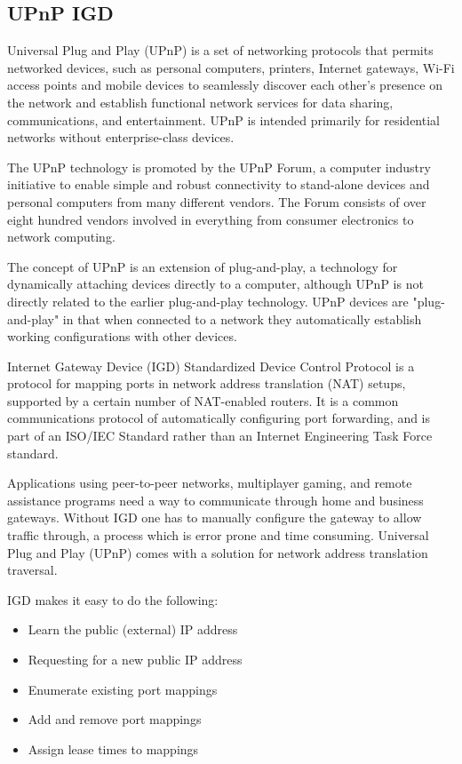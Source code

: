 \subsection{UPnP IGD}

Universal Plug and Play (UPnP)\cite{jeronimo2003upnp} is a set of networking protocols that permits networked devices, such as personal computers, printers, Internet gateways, Wi-Fi access points and mobile devices to seamlessly discover each other's presence on the network and establish functional network services for data sharing, communications, and entertainment. UPnP is intended primarily for residential networks without enterprise-class devices.

The UPnP technology is promoted by the UPnP Forum, a computer industry initiative to enable simple and robust connectivity to stand-alone devices and personal computers from many different vendors. The Forum consists of over eight hundred vendors involved in everything from consumer electronics to network computing.

The concept of UPnP is an extension of plug-and-play, a technology for dynamically attaching devices directly to a computer, although UPnP is not directly related to the earlier plug-and-play technology. UPnP devices are "plug-and-play" in that when connected to a network they automatically establish working configurations with other devices.

Internet Gateway Device (IGD) Standardized Device Control Protocol is a protocol for mapping ports in network address translation (NAT) setups, supported by a certain number of NAT-enabled routers.\cite{wing2013p} It is a common communications protocol of automatically configuring port forwarding, and is part of an ISO/IEC Standard \cite{sherwin2009upnp} rather than an Internet Engineering Task Force standard.

Applications using peer-to-peer networks, multiplayer gaming, and remote assistance programs need a way to communicate through home and business gateways. Without IGD one has to manually configure the gateway to allow traffic through, a process which is error prone and time consuming. Universal Plug and Play (UPnP) comes with a solution for network address translation traversal.

IGD makes it easy to do the following:

\begin{itemize}
  \item Learn the public (external) IP address
  \item Requesting for a new public IP address\cite{srisuresh1999ip}
  \item Enumerate existing port mappings
  \item Add and remove port mappings
  \item Assign lease times to mappings
\end{itemize}
